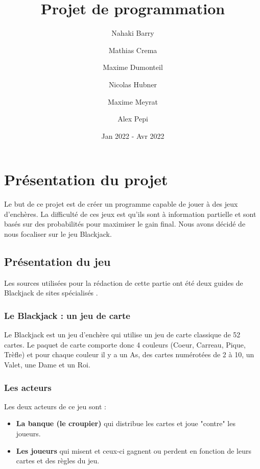 \documentclass{article}
\title{\textbf{Projet de programmation}}
\date{Jan 2022 - Avr 2022}
\author{Nahaki Barry \and Mathias Crema \and Maxime Dumonteil \and Nicolas Hubner \and Maxime Meyrat \and Alex Pepi}
\begin{document}
\maketitle
\newpage

\renewcommand{\contentsname}{Sommaire}
\tableofcontents
\cleardoublepage
 
\newpage
 
\renewcommand{\listfigurename}{Liste des figures}
\listoffigures
 
\newpage

\section{Présentation du projet}
Le but de ce projet est de créer un programme capable de jouer à des jeux d'enchères. La difficulté de ces jeux est qu'ils sont à information partielle et sont basés sur des probabilités pour maximiser le gain final. Nous avons décidé de nous focaliser sur le jeu Blackjack.

\subsection{Présentation du jeu}

Les sources utilisées pour la rédaction de cette partie ont été deux guides de Blackjack de sites spécialisés \cite{blackjack_regles_1} \cite{blackjack_regles_2}.

\subsubsection{Le Blackjack : un jeu de carte}

Le Blackjack est un jeu d'enchère qui utilise un jeu de carte classique de 52 cartes. Le paquet de carte comporte donc 4 couleurs (Coeur, Carreau, Pique, Trèfle) et pour chaque couleur il y a un As, des cartes numérotées de 2 à 10, un Valet, une Dame et un Roi.

\subsubsection{Les acteurs}

Les deux acteurs de ce jeu sont :
\begin{itemize}
    \item \textbf{La banque (le croupier)} qui distribue les cartes et joue "contre" les joueurs.
    \item \textbf{Les joueurs} qui misent et ceux-ci gagnent ou perdent en fonction de leurs cartes et des règles du jeu.
\end{itemize}
\end{document}
